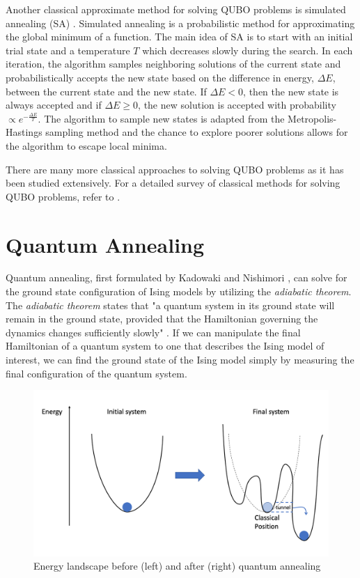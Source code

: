 Another classical approximate method for solving QUBO problems is simulated annealing (SA) \cite{KATAYAMA2001103}. Simulated annealing \cite{Kirkpatrick} is a probabilistic method for approximating the global minimum of a function. The main idea of SA is to start with an initial trial state and a temperature $T$ which decreases slowly during the search. In each iteration, the algorithm samples neighboring solutions of the current state and probabilistically accepts the new state based on the difference in energy, $\Delta E$, between the current state and the new state. If $\Delta E < 0$, then the new state is always accepted and if $\Delta E \geq 0$, the new solution is accepted with probability $\propto e^{-\frac{\Delta E}{T}}$. The algorithm to sample new states is adapted from the Metropolis-Hastings sampling method \cite{metropolissampling} and the chance to explore poorer solutions allows for the algorithm to escape local minima.

There are many more classical approaches to solving QUBO problems as it has been studied extensively. For a detailed survey of classical methods for solving QUBO problems, refer to \cite{punnen2022quadratic}.

\section{Quantum Annealing}\label{section:annealing}
Quantum annealing, first formulated by Kadowaki and Nishimori , can solve for the ground state configuration of Ising models by utilizing the \textit{adiabatic theorem}. The \textit{adiabatic theorem} states that "a quantum system in its ground state will remain in the ground state, provided that the Hamiltonian governing the dynamics changes sufficiently slowly" \cite{b14,b15}. If we can manipulate the final Hamiltonian of a quantum system to one that describes the Ising model of interest, we can find the ground state of the Ising model simply by measuring the final configuration of the quantum system.

\begin{figure}[h!]
    \centering
    \includegraphics[width=0.8\linewidth]{images/quantum_annealing.png}
    \caption{Energy landscape before (left) and after (right) quantum annealing}
    \label{quantumannealing}
\end{figure}

